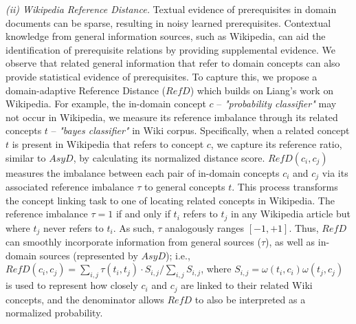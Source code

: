 \textit{(ii) Wikipedia Reference Distance.}
Textual evidence of prerequisites in domain documents can be sparse, resulting in noisy learned prerequisites.  
Contextual knowledge from general information sources, such as Wikipedia, can aid the identification of prerequisite relations by providing supplemental evidence.  
We observe that related general information that refer to domain concepts can also provide statistical evidence of prerequisites. 
To capture this, we propose a domain-adaptive Reference Distance ($RefD$) which builds on Liang's work \cite{liang2015measuring} on Wikipedia. 
For example, the in-domain concept $c$ -- \textit{"probability classifier"} may not occur in Wikipedia, we measure its reference imbalance through its related concepts $t$ -- \textit{"bayes classifier"} in Wiki corpus.
Specifically, when a related concept $t$ is present in Wikipedia that refers to concept $c$, we capture its reference ratio, similar to $AsyD$, by calculating its normalized distance score.
$RefD(c_i, c_j)$ measures the imbalance between each pair of in-domain concepts $c_i$ and $c_j$ via its associated reference imbalance $\tau$ to general concepts $t$. This process transforms the concept linking task to one of locating related concepts in Wikipedia. 
The reference imbalance $\tau=1$ if and only if $t_{i}$ refers to $t_{j}$ in any Wikipedia article but where $t_{j}$ never refers to $t_{i}$. As such, $\tau$ analogously ranges $[-1,+1]$. Thus, $RefD$ can smoothly incorporate information from general sources ($\tau$), as well as in-domain sources (represented by $AsyD$); i.e., 
$RefD(c_i, c_j)=\sum_{i,j} \tau(t_i,t_j) \cdot S_{i,j}/\sum_{i,j} S_{i,j}$, where 
$S_{i,j}= \omega(t_i,c_i) \omega(t_j,c_j)$ is used to represent how closely $c_i$ and $c_j$ are linked to their related Wiki concepts, and the denominator allows $RefD$ to also be interpreted as a normalized probability. 


